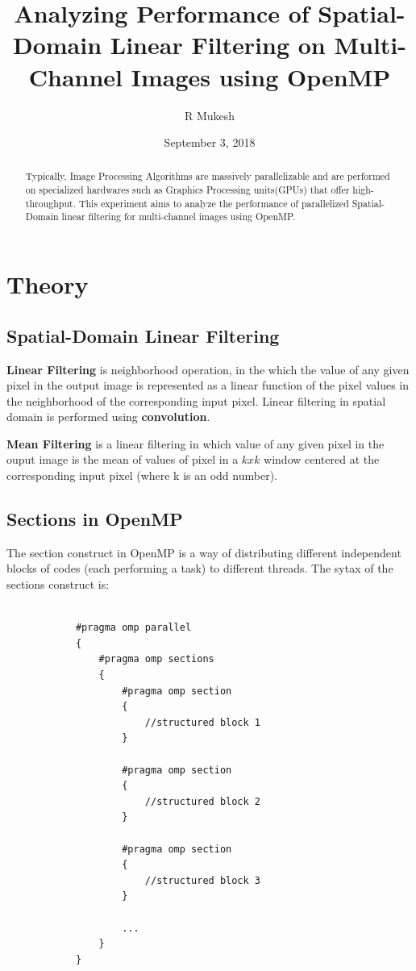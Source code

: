 \documentclass{article}
\title{Analyzing Performance of Spatial-Domain Linear Filtering on Multi-Channel Images using OpenMP}
\author{R Mukesh}
\affil{IIITDM, Kancheepuram}
\date{September 3, 2018}
\begin{document}
	\maketitle
	
	\begin{abstract}
		Typically, Image Processing Algorithms are massively parallelizable and are performed on specialized hardwares such as Graphics Processing units(GPUs) that offer high-throughput. This experiment aims to analyze the performance of parallelized Spatial-Domain linear filtering for multi-channel images using OpenMP.
	\end{abstract}
	
	\section{Theory}
	
		\subsection{Spatial-Domain Linear Filtering}
			\textbf{Linear Filtering} is neighborhood operation, in the which the value of any given pixel in the output image is represented as a linear function of the pixel values in the neighborhood of the corresponding input pixel. Linear filtering in spatial domain is performed using \textbf{convolution}.
			
			\textbf{Mean Filtering} is a linear filtering in which value of any given pixel in the ouput image is the mean of values of pixel in a \(kxk\) window centered at the corresponding input pixel (where k is an odd number).
					
		\subsection{Sections in OpenMP}
			
			The section construct in OpenMP is a way of distributing different independent blocks of codes (each performing a task) to different threads. The sytax of the sections construct is:
			
		\begin{lstlisting}[style=CStyle]
		
			#pragma omp parallel
			{
				#pragma omp sections
				{
					#pragma omp section
					{
						//structured block 1
					}
					
					#pragma omp section
					{
						//structured block 2
					}
					
					#pragma omp section
					{
						//structured block 3
					}
					
					...
				}
			}
		\end{lstlisting}				
			
\end{document}
